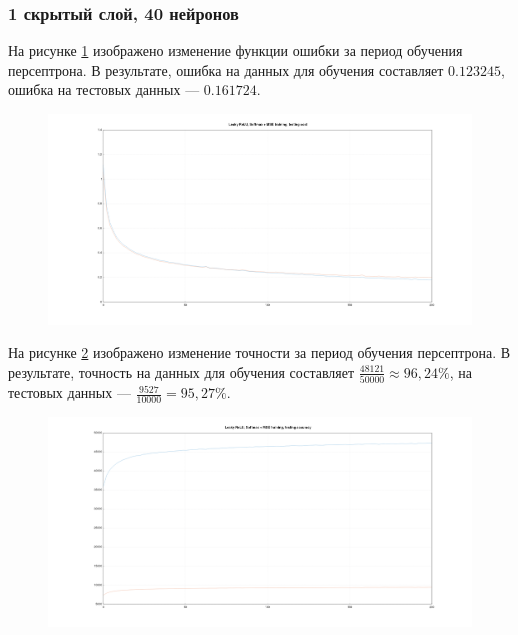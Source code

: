 \documentclass[a4paper, 14pt]{extarticle}
\begin{document}
\subsubsection{1 скрытый слой, 40 нейронов}


На рисунке \ref{fig:1_40_leaky_relu_softmax_mse_cost} изображено изменение функции ошибки за период обучения персептрона.
В результате, ошибка на данных для обучения составляет $0.123245$, ошибка на тестовых данных --- $0.161724$.

\begin{figure}[!htb]
  \centering\includegraphics[width=\textwidth]{images/1_40_leaky_relu_softmax_mse_cost.png}
  \caption{}
  \label{fig:1_40_leaky_relu_softmax_mse_cost}
\end{figure}

На рисунке \ref{fig:1_40_leaky_relu_softmax_mse_accuracy} изображено изменение точности за период обучения персептрона.
В результате, точность на данных для обучения составляет $\frac{48121}{50000} \approx 96,24\%$, на тестовых данных --- $\frac{9527}{10000} = 95,27\%$.

\begin{figure}[!htb]
  \centering\includegraphics[width=\textwidth]{images/1_40_leaky_relu_softmax_mse_accuracy.png}
  \caption{}
  \label{fig:1_40_leaky_relu_softmax_mse_accuracy}
\end{figure}
\end{document}
